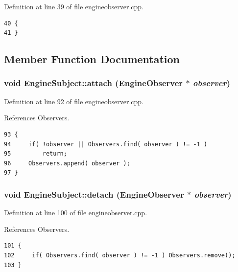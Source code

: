 Definition at line 39 of file engineobserver.cpp.



\footnotesize\begin{verbatim}40 {
41 }
\end{verbatim}\normalsize 


\subsection{Member Function Documentation}
\subsubsection{\setlength{\rightskip}{0pt plus 5cm}void Engine\-Subject::attach ({\bf Engine\-Observer} $\ast$ {\em observer})}\label{classEngineSubject_EngineSubjecta0}




Definition at line 92 of file engineobserver.cpp.

References Observers.



\footnotesize\begin{verbatim}93 {
94     if( !observer || Observers.find( observer ) != -1 )
95         return;
96     Observers.append( observer );
97 }
\end{verbatim}\normalsize 
{}
\subsubsection{\setlength{\rightskip}{0pt plus 5cm}void Engine\-Subject::detach ({\bf Engine\-Observer} $\ast$ {\em observer})}\label{classEngineSubject_EngineSubjecta1}




Definition at line 100 of file engineobserver.cpp.

References Observers.



\footnotesize\begin{verbatim}101 {
102     if( Observers.find( observer ) != -1 ) Observers.remove();
103 }
\end{verbatim}\normalsize 
{}
